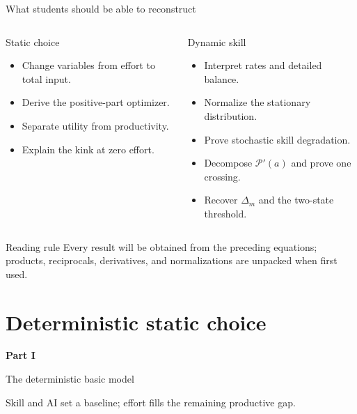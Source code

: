 \documentclass[aspectratio=169,10pt]{beamer}
\newcommand{\calP}{\mathcal{P}}
\begin{document}
\begin{frame}{What students should be able to reconstruct}
\begin{columns}[T,onlytextwidth]
\begin{block}{Static choice}
\begin{itemize}
  \item Change variables from effort to total input.
  \item Derive the positive-part optimizer.
  \item Separate utility from productivity.
  \item Explain the kink at zero effort.
\end{itemize}
\end{block}
\begin{block}{Dynamic skill}
\begin{itemize}
  \item Interpret rates and detailed balance.
  \item Normalize the stationary distribution.
  \item Prove stochastic skill degradation.
  \item Decompose $\calP'(a)$ and prove one crossing.
  \item Recover $\Delta_m$ and the two-state threshold.
\end{itemize}
\end{block}
\end{columns}
\vspace{4mm}
\begin{exampleblock}{Reading rule}
Every result will be obtained from the preceding equations; products, reciprocals, derivatives, and normalizations are unpacked when first used.
\end{exampleblock}
\end{frame}


\section{Deterministic static choice}

\begin{frame}[plain]
\vspace{20mm}
{\color{white}\Huge\bfseries Part I\par}
\vspace{4mm}
{\color{white}\LARGE The deterministic basic model\par}
\vspace{8mm}
{\color{white!75}\large Skill and AI set a baseline; effort fills the remaining productive gap.\par}
\end{frame}
\end{document}
